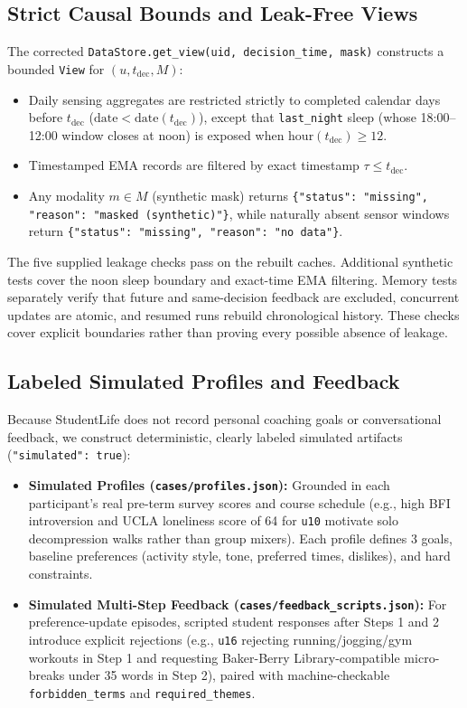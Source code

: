 \documentclass{article}
\begin{document}
\subsection{Strict Causal Bounds and Leak-Free Views}
The corrected \texttt{DataStore.get\_view(uid, decision\_time, mask)} constructs a bounded \texttt{View} for $(u,t_{\mathrm{dec}},M)$:
\begin{itemize}
  \item Daily sensing aggregates are restricted strictly to completed calendar days before $t_{\text{dec}}$ ($\text{date} < \text{date}(t_{\text{dec}})$), except that \texttt{last\_night} sleep (whose 18:00--12:00 window closes at noon) is exposed when $\text{hour}(t_{\text{dec}}) \ge 12$.
  \item Timestamped EMA records are filtered by exact timestamp $\tau \le t_{\text{dec}}$.
  \item Any modality $m \in M$ (synthetic mask) returns \texttt{\{"status": "missing", "reason": "masked (synthetic)"\}}, while naturally absent sensor windows return \texttt{\{"status": "missing", "reason": "no data"\}}.
\end{itemize}
The five supplied leakage checks pass on the rebuilt caches. Additional synthetic tests cover the noon sleep boundary and exact-time EMA filtering. Memory tests separately verify that future and same-decision feedback are excluded, concurrent updates are atomic, and resumed runs rebuild chronological history. These checks cover explicit boundaries rather than proving every possible absence of leakage.

\subsection{Labeled Simulated Profiles and Feedback}
Because StudentLife does not record personal coaching goals or conversational feedback, we construct deterministic, clearly labeled simulated artifacts (\texttt{"simulated": true}):
\begin{itemize}
  \item \textbf{Simulated Profiles (\texttt{cases/profiles.json}):} Grounded in each participant's real pre-term survey scores and course schedule (e.g., high BFI introversion and UCLA loneliness score of 64 for \texttt{u10} motivate solo decompression walks rather than group mixers). Each profile defines 3 goals, baseline preferences (activity style, tone, preferred times, dislikes), and hard constraints.
  \item \textbf{Simulated Multi-Step Feedback (\texttt{cases/feedback\_scripts.json}):} For preference-update episodes, scripted student responses after Steps 1 and 2 introduce explicit rejections (e.g., \texttt{u16} rejecting running/jogging/gym workouts in Step 1 and requesting Baker-Berry Library-compatible micro-breaks under 35 words in Step 2), paired with machine-checkable \texttt{forbidden\_terms} and \texttt{required\_themes}.
\end{itemize}
\end{document}
